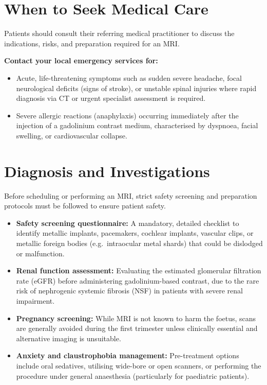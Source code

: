 \section*{When to Seek Medical Care}
Patients should consult their referring medical practitioner to discuss the indications, risks, and preparation required for an MRI.

\textbf{Contact your local emergency services for:}
\begin{itemize}
    \item Acute, life-threatening symptoms such as sudden severe headache, focal neurological deficits (signs of stroke), or unstable spinal injuries where rapid diagnosis via CT or urgent specialist assessment is required.
    \item Severe allergic reactions (anaphylaxis) occurring immediately after the injection of a gadolinium contrast medium, characterised by dyspnoea, facial swelling, or cardiovascular collapse.
\end{itemize}

\section*{Diagnosis and Investigations}
Before scheduling or performing an MRI, strict safety screening and preparation protocols must be followed to ensure patient safety.
\begin{itemize}
    \item \textbf{Safety screening questionnaire:} A mandatory, detailed checklist to identify metallic implants, pacemakers, cochlear implants, vascular clips, or metallic foreign bodies (e.g.\ intraocular metal shards) that could be dislodged or malfunction.
    \item \textbf{Renal function assessment:} Evaluating the estimated glomerular filtration rate (eGFR) before administering gadolinium-based contrast, due to the rare risk of nephrogenic systemic fibrosis (NSF) in patients with severe renal impairment.
    \item \textbf{Pregnancy screening:} While MRI is not known to harm the foetus, scans are generally avoided during the first trimester unless clinically essential and alternative imaging is unsuitable.
    \item \textbf{Anxiety and claustrophobia management:} Pre-treatment options include oral sedatives, utilising wide-bore or open scanners, or performing the procedure under general anaesthesia (particularly for paediatric patients).
\end{itemize}

